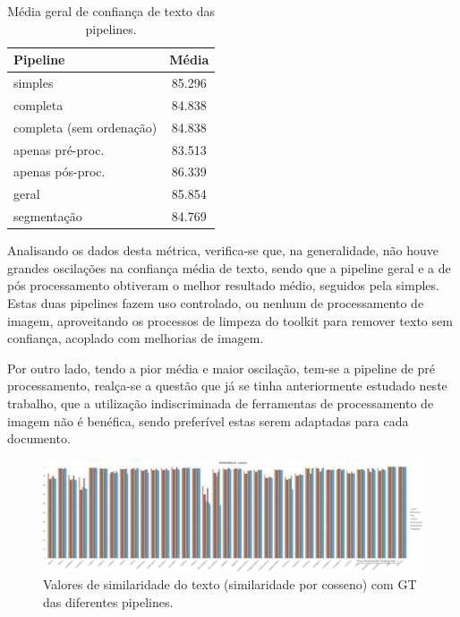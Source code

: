 \begin{table}[H]
	\centering
	\small
	\begin{tabular}{|l|c|}
		\hline
		\textbf{Pipeline} & \textbf{Média} \\ \hline
		simples & 85.296 				   \\ \hline
		completa & 84.838 				   \\ \hline
		completa (sem ordenação) & 84.838  \\ \hline
		apenas pré-proc. & 83.513 		   \\ \hline
		apenas pós-proc. & 86.339 		   \\ \hline
		geral & 85.854 					   \\ \hline
		segmentação & 84.769 			   \\ \hline
	\end{tabular}
	\caption{Média geral de confiança de texto das pipelines.}
\end{table}


Analisando os dados desta métrica, verifica-se que, na generalidade, não houve grandes oscilações na confiança média de texto, sendo que a pipeline geral e a de pós processamento obtiveram o melhor resultado médio, seguidos pela simples. Estas duas pipelines fazem uso controlado, ou nenhum de processamento de imagem, aproveitando os processos de limpeza do toolkit para remover texto sem confiança, acoplado com melhorias de imagem.

Por outro lado, tendo a pior média e maior oscilação, tem-se a pipeline de pré processamento, realça-se a questão que já se tinha anteriormente estudado neste trabalho, que a utilização indiscriminada de ferramentas de processamento de imagem não é benéfica, sendo preferível estas serem adaptadas para cada documento. 


\begin{figure}[H]
	\centering
	\hspace*{-2cm}
	\includegraphics[width=1.25\textwidth]{images/resultados/graph_gt_similiraty_cosine.png}
	\caption{Valores de similaridade do texto (similaridade por cosseno) com GT das diferentes pipelines.}
	\label{fig:graph_gt_similiraty_cosine}
\end{figure}


